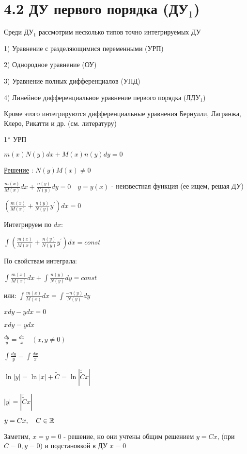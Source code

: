 \documentclass[12pt]{article}
\begin{document}
    \section{4.2 ДУ первого порядка (ДУ$\displaystyle _1$)}

    \Nota Среди ДУ$\displaystyle _1$ рассмотрим несколько типов точно интегрируемых ДУ

    1) Уравнение с разделяющимися переменными (УРП)

    2) Однородное уравнение (ОУ)

    3) Уравнение полных дифференциалов (УПД)

    4) Линейное дифференциальное уравнение первого порядка (ЛДУ$\displaystyle _1$)

    Кроме этого интегрируются дифференциальные уравнения Бернулли, Лагранжа, Клеро, Рикатти и др. (см. литературу)

    1* УРП

    \Def $m(x)N(y)dx + M(x)n(y)dy = 0$

    \underline{Решение} : $N(y)M(x) \neq 0$

    $\displaystyle \frac{m(x)}{M(x)}dx + \frac{n(y)}{N(y)}dy = 0 \quad y = y(x)$ - неизвестная функция (ее ищем, решая ДУ)

    $\displaystyle (\frac{m(x)}{M(x)} + \frac{n(y)}{N(y)}y^\prime)dx = 0$

    Интегрируем по $dx$:

    $\displaystyle \int \left(\frac{m(x)}{M(x)} + \frac{n(y)}{N(y)}y^\prime\right)dx = const$

    По свойствам интеграла:

    $\displaystyle \int \frac{m(x)}{M(x)}dx + \int\frac{n(y)}{N(y)}dy = const$

    или: $\displaystyle \int \frac{m(x)}{M(x)}dx = \int\frac{-n(y)}{N(y)}dy$

    \Ex $xdy - ydx = 0$

    $xdy = ydx$

    $\displaystyle \frac{dy}{y} = \frac{dx}{x} \quad (x, y \neq 0)$

    $\displaystyle \int \frac{dy}{y} = \int \frac{dx}{x}$

    $\ln|y| = \ln|x| + \tilde{C} = \ln|\tilde{\tilde{C}}x|$

    $|y| = |\tilde{\tilde{C}}x|$

    $y = Cx, \quad C \in \mathbb{R}$

    Заметим, $x = y = 0$ - решение, но они учтены общим решением $y = Cx$, (при $C = 0, y = 0$) и подстановкой в ДУ $x = 0$
\end{document}
